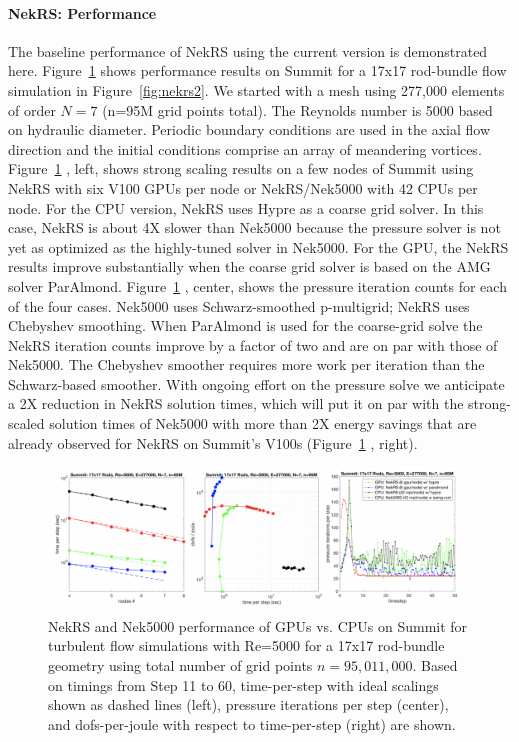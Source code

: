 \documentclass[11pt,letterpaper,english]{article}
\begin{document}
\paragraph{NekRS: Performance} The baseline performance of NekRS using the current version \cite{tomov2019ecp} is demonstrated here. Figure~\ref{fig:nekrs1} shows performance results on Summit for a 17x17 rod-bundle flow simulation in Figure~\ref{fig:nekrs2}. We started with a mesh using 277,000 elements of order $N=7$ (n=95M grid points total). The Reynolds number is 5000 based on hydraulic diameter. Periodic boundary conditions are used in the axial flow direction and the initial conditions comprise an array of meandering vortices.  Figure~\ref{fig:nekrs1} , left, shows strong scaling results on a few nodes of Summit using NekRS with six V100 GPUs per node or NekRS/Nek5000 with 42 CPUs per node. For the CPU version, NekRS uses Hypre as a coarse grid solver. In this case, NekRS is about 4X slower than Nek5000 because the pressure solver is not yet as optimized as the highly-tuned solver in Nek5000. For the GPU, the NekRS results improve substantially when the coarse grid solver is based on the AMG solver ParAlmond.  Figure~\ref{fig:nekrs1} , center, shows the pressure iteration counts for each of the four cases. Nek5000 uses Schwarz-smoothed p-multigrid; NekRS uses Chebyshev smoothing. When ParAlmond is used for the coarse-grid solve the NekRS iteration counts improve by a factor of two and are on par with those of Nek5000. The Chebyshev smoother requires more work per iteration than the Schwarz-based smoother.  With ongoing effort on the pressure solve we anticipate a 2X reduction in NekRS solution times, which will put it on par with the strong-scaled solution times of Nek5000 with more than 2X energy savings that are already observed for NekRS on Summit's V100s (Figure~\ref{fig:nekrs1} , right).

\begin{figure}[h]
\centering
\includegraphics[width=\textwidth]{../figures/performance_nekrs}
\caption{ NekRS and Nek5000 performance of GPUs vs. CPUs on Summit for turbulent flow simulations with Re=5000 for a 17x17 rod-bundle geometry using total number of grid points $n=95,011,000$. Based on timings from Step 11 to 60, time-per-step with ideal scalings shown as dashed lines (left), pressure iterations per step (center), and dofs-per-joule with respect to time-per-step (right) are shown.}
\label{fig:nekrs1}
\end{figure}
\end{document}
